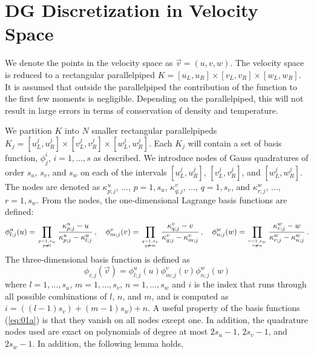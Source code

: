 \documentclass[12pt]{CSUNthesis}
\begin{document}
\section{DG Discretization in Velocity Space}
We denote the points in the velocity space as $\vec{v} = (u,v,w)$. The velocity space is reduced to a rectangular parallelpiped $K=[u_L, u_R] \times [v_L,v_R] \times [w_L,w_R]$. It is assumed that outside the parallelpiped the contribution of the function to the first few moments is negligible. Depending on the parallelpiped, this will not result in large errors in terms of conservation of density and temperature. 

We partition $K$ into $N$ smaller rectangular parallelpipeds $K_j = [u_L^j, u_R^j] \times [v_L^j, v_R^j] \times [w_L^j, w_R^j]$. Each $K_j$ will contain a set of basis function, $\phi_j^i$, $i=1,\dots, s$ as described. We introduce nodes of Gauss quadratures of order $s_u$, $s_v$, and $s_w$ on each of the intervals $[u_L^j,u_R^j]$, $[v_L^j,v_R^j]$, and $[w_L^j,w_R^j]$. The nodes are denoted as
$\kappa^{u}_{p;j}$, $\dots$, $p=1,s_{u}$,
$\kappa^{v}_{q;j}$, $\dots$, $q=1,s_{v}$, and 
$\kappa^{w}_{r;j}$, $\dots$, $r=1,s_{w}$. 
 From the nodes, the one-dimensional Lagrange basis functions are defined:
\begin{equation}
\label{eq:01}
\phi^{u}_{l;j}(u)=\prod_{{p=1,s_{u}} \atop {p\neq l}} \frac{\kappa^{u}_{p;j}-u}{\kappa^{u}_{p;j}-\kappa^{u}_{l;j}}\, ,\quad 
\phi^{v}_{m;j}(v)=\prod_{{q=1,s_{v}} \atop {q\neq m}} \frac{\kappa^{v}_{q;j}-v}{\kappa^{v}_{q;j}-\kappa^{v}_{m;j}}\, ,\quad 
\phi^{w}_{n;j}(w)=\prod_{{r=1,s_{w}} \atop {r\neq n}} \frac{\kappa^{w}_{r;j}-w}{\kappa^{w}_{r;j}-\kappa^{w}_{n;j}}\, .
\end{equation}
The three-dimensional basis function is defined as
\begin{equation}
\label{eq:01a}
\phi_{i;j}(\vec{v})=\phi^{u}_{l;j}(u)\phi^{v}_{m;j}(v)
\phi^{w}_{n;j}(w)
\end{equation} 
where $l=1, \dots , s_u$, 
$m=1,\dots ,s_v$, 
$n=1,\dots ,s_w$ and $i$ 
is the index that runs through all possible combinations of $l$, $n$, and $m$, and is computed as $i=((l-1)s_v)+(m-1)s_w)+n$.  
A useful property of the basis functions (\ref{eq:01a}) is that they vanish on all nodes except one. In addition, the quadrature nodes used are exact on polynomials of degree at most $2s_u-1$, $2s_v-1$, and $2s_w-1$. In addition, the following lemma holds,
\end{document}
